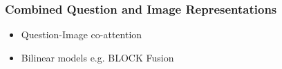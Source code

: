 \subsubsection*{Combined Question and Image Representations}

\begin{itemize}
    \item Question-Image co-attention \cite{lu2016hierarchical}
    \item Bilinear models e.g. BLOCK Fusion \cite{ben2019block}
\end{itemize}













  

